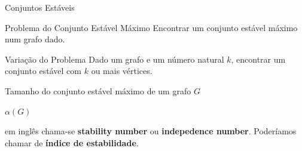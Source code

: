 \documentclass[xcolor=dvipsnames,table]{beamer}
\begin{document}
	\begin{frame}{Conjuntos Estáveis}
		\begin{block}{Problema do Conjunto Estável Máximo}
			Encontrar um conjunto estável máximo num grafo dado.
		\end{block} \pause
		\begin{block}{Variação do Problema}
			Dado um grafo e um número natural $k$, encontrar um conjunto estável com $k$ ou mais vértices.
		\end{block} \pause
		\begin{block}{Tamanho do conjunto estável máximo de um grafo $G$}
			\begin{center}
				$\alpha (G)$
			\end{center} \pause
			em inglês chama-se {\bf stability number} ou {\bf indepedence number}. \pause Poderíamos chamar de {\bf índice de estabilidade}.
		\end{block}
	\end{frame}
	
	\begin{frame}
		\titlepage
	\end{frame}
	
\end{document}
